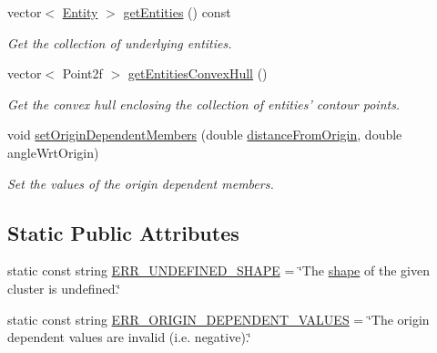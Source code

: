 \begin{DoxyCompactItemize}
vector$<$ \hyperlink{classmultiscale_1_1analysis_1_1Entity}{\-Entity} $>$ \hyperlink{classmultiscale_1_1analysis_1_1Cluster_aedd64d46ad3ea61ce7bb76be1f0906e6}{get\-Entities} () const 
\begin{DoxyCompactList}\small\item\em \-Get the collection of underlying entities. \end{DoxyCompactList}\item 
vector$<$ \-Point2f $>$ \hyperlink{classmultiscale_1_1analysis_1_1Cluster_a9f43161c58d9e4a97f3a33807397b255}{get\-Entities\-Convex\-Hull} ()
\begin{DoxyCompactList}\small\item\em \-Get the convex hull enclosing the collection of entities' contour points. \end{DoxyCompactList}\item 
void \hyperlink{classmultiscale_1_1analysis_1_1Cluster_a84033ee8d583d9195abbf42d5d420915}{set\-Origin\-Dependent\-Members} (double \hyperlink{classmultiscale_1_1analysis_1_1SpatialEntityPseudo3D_a056f67b90ed41c0e6dc4df31b71ad906}{distance\-From\-Origin}, double angle\-Wrt\-Origin)
\begin{DoxyCompactList}\small\item\em \-Set the values of the origin dependent members. \end{DoxyCompactList}\end{DoxyCompactItemize}
\subsection*{\-Static \-Public \-Attributes}
\begin{DoxyCompactItemize}
\item 
static const string \hyperlink{classmultiscale_1_1analysis_1_1Cluster_a546b8e93e3f1ef51a9932f8599639070}{\-E\-R\-R\-\_\-\-U\-N\-D\-E\-F\-I\-N\-E\-D\-\_\-\-S\-H\-A\-P\-E} = \char`\"{}\-The \hyperlink{classmultiscale_1_1analysis_1_1SpatialEntityPseudo3D_abad3acd3d7067e8e86e168e692cb2c2e}{shape} of the given cluster is undefined.\char`\"{}
\item 
static const string \hyperlink{classmultiscale_1_1analysis_1_1Cluster_a0fa38fcc3f00730409400578829cddd8}{\-E\-R\-R\-\_\-\-O\-R\-I\-G\-I\-N\-\_\-\-D\-E\-P\-E\-N\-D\-E\-N\-T\-\_\-\-V\-A\-L\-U\-E\-S} = \char`\"{}\-The origin dependent values are invalid (i.\-e. negative).\char`\"{}
\end{DoxyCompactItemize}
